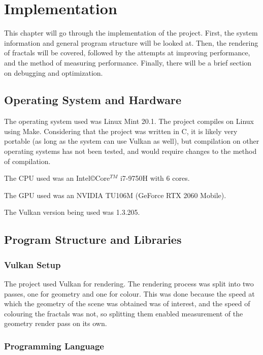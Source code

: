 \chapter{Implementation}
\label{chapter3}

This chapter will go through the implementation of the project. First, the system information and general program structure will be looked at. Then, the rendering of fractals will be covered, followed by the attempts at improving performance, and the method of measuring performance. Finally, there will be a brief section on debugging and optimization.

\section{Operating System and Hardware}

The operating system used was Linux Mint 20.1. The project compiles on Linux using Make. Considering that the project was written in C, it is likely very portable (as long as the system can use Vulkan as well), but compilation on other operating systems has not been tested, and would require changes to the method of compilation.\newline

The CPU used was an Intel\copyright Core$^{TM}$ i7-9750H with 6 cores.

The GPU used was an NVIDIA TU106M (GeForce RTX 2060 Mobile).

The Vulkan version being used was 1.3.205.

\section{Program Structure and Libraries}

\subsection{Vulkan Setup}

The project used Vulkan for rendering. The rendering process was split into two passes, one for geometry and one for colour. This was done because the speed at which the geometry of the scene was obtained was of interest, and the speed of colouring the fractals was not, so splitting them enabled measurement of the geometry render pass on its own.

\subsection{Programming Language}

